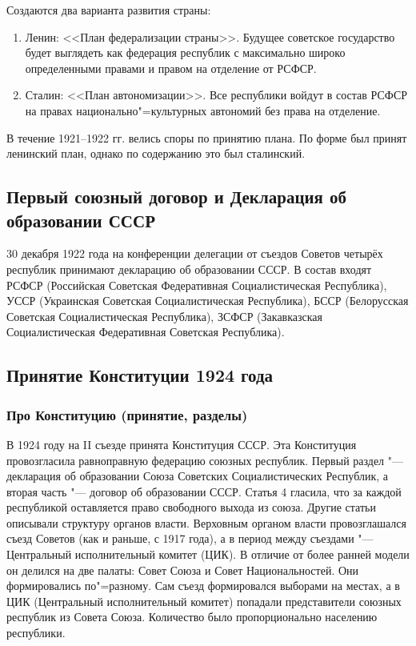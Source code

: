 Создаются два варианта развития страны:

\begin{enumerate}
    \item Ленин: <<План федерализации страны>>. Будущее советское государство будет выглядеть как федерация республик с максимально широко определенными правами и правом на отделение от РСФСР.
    \item Сталин: <<План автономизации>>. Все республики войдут в состав РСФСР на правах национально"=культурных автономий без права на отделение.
\end{enumerate}

В течение 1921--1922 гг. велись споры по принятию плана. По форме был принят ленинский план, однако по содержанию это был сталинский.

\subsection{Первый союзный договор и Декларация об образовании СССР}

30 декабря 1922 года на конференции делегации от съездов Советов четырёх республик принимают декларацию об образовании СССР. В состав входят РСФСР (Российская Советская Федеративная Социалистическая Республика), УССР (Украинская Советская Социалистическая Республика), БССР (Белорусская Советская Социалистическая Республика), ЗСФСР (Закавказская Социалистическая Федеративная Советская Республика).

\subsection{Принятие Конституции 1924 года}

\subsubsection{\textbf{Про Конституцию (принятие, разделы)}}
В 1924 году на II съезде принята Конституция СССР. Эта Конституция провозгласила равноправную федерацию союзных республик. Первый раздел "--- декларация об образовании Союза Советских Социалистических Республик, а вторая часть "--- договор об образовании СССР. Статья 4 гласила, что за каждой республикой оставляется право свободного выхода из союза. Другие статьи описывали структуру органов власти. Верховным органом власти провозглашался съезд Советов (как и раньше, с 1917 года), а в период между съездами "--- Центральный исполнительный комитет (ЦИК). В отличие от более ранней модели он делился на две палаты: Совет Союза и Совет Национальностей. Они формировались по"=разному. Сам съезд формировался выборами на местах, а в ЦИК (Центральный исполнительный комитет) попадали представители союзных республик из Совета Союза. Количество было пропорционально населению республики.

